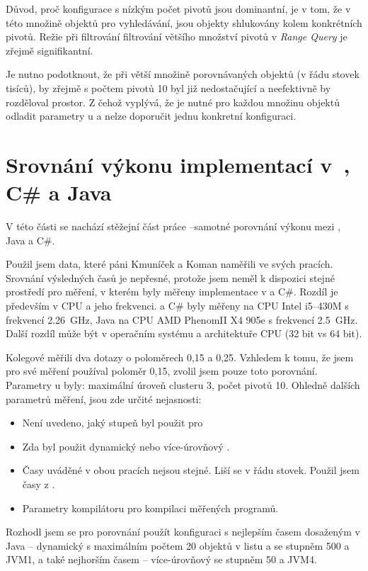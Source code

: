 Důvod, proč konfigurace s nízkým počet pivotů jsou dominantní, je v tom, že v této množině objektů pro vyhledávání, jsou objekty shlukovány kolem konkrétních pivotů.
Režie při filtrování filtrování většího množství pivotů v \emph{Range Query} je zřejmě signifikantní.

Je nutno podotknout, že při větší množině porovnávaných objektů (v řádu stovek tisíců), by zřejmě \MIndex{} s počtem pivotů 10 byl již nedostačující a neefektivně by rozděloval prostor.
Z čehož vyplývá, že je nutné pro každou množinu objektů odladit parametry \MIndex u a nelze doporučit jednu konkretní konfiguraci.

\section{Srovnání výkonu implementací v~{\protect \CC}, C\# a Java}
V této části se nachází stěžejní část práce --samotné porovnání výkonu \MIndex{} mezi \CC, Java a C\#.

Použil jsem data, které páni Kmuníček a Koman naměřili ve svých pracích\cite{Kmunicek2011thesis}\cite{Koman2012thesis}.
Srovnání výsledných časů je nepřesné, protože jsem neměl k dispozici stejné prostředí pro měření, v kterém byly měřeny implementace v \CC a C\#.
Rozdíl je především v CPU a jeho frekvenci.
\CC a C\# byly měřeny na CPU Intel i5--430M s frekvencí \SI{2,26}{\GHz}, Java na CPU AMD Phenom\texttrademark II X4 905e s frekvencí \SI{2,5}{\GHz}.
Další rozdíl může být v operačním systému a architektuře CPU (32 bit vs 64 bit).

Kolegové měřili dva dotazy o poloměrech 0,15 a 0,25.
Vzhledem k tomu, že jsem pro své měření používal poloměr 0,15, zvolil jsem pouze toto porovnání.
Parametry \MIndex u byly: maximální úroveň clusteru 3, počet pivotů 10.
Ohledně dalších parametrů měření, jsou zde určité nejasnosti:
\begin{itemize}
\item Není uvedeno, jaký stupeň byl použit pro \BPTree{}
\item Zda byl použit dynamický nebo více-úrovňový \MIndex.
\item Časy uváděné v obou pracích nejsou stejné. Liší se v řádu stovek. Použil jsem časy z \cite{Kmunicek2011thesis}.
\item Parametry kompilátoru pro kompilaci měřených programů.
\end{itemize}

Rozhodl jsem se pro porovnání použít konfiguraci s nejlepším časem dosaženým v Java -- dynamický \MIndex{} s maximálním počtem 20 objektů v listu a se stupněm \BPTree{} 500 a JVM1, a také nejhorším časem -- více-úrovňový \MIndex{} se stupněm \BPTree{} 50 a JVM4.


